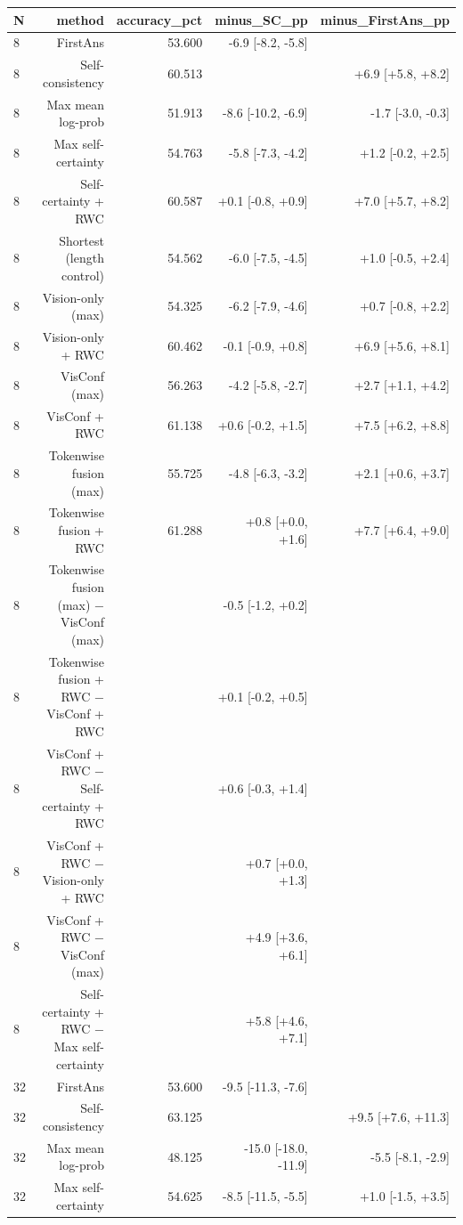 \begin{tabular}{lrrrr}
\toprule
N & method & accuracy\_pct & minus\_SC\_pp & minus\_FirstAns\_pp \\
\midrule
8 & FirstAns & 53.600 & -6.9 [-8.2, -5.8] &  \\
8 & Self-consistency & 60.513 &  & +6.9 [+5.8, +8.2] \\
8 & Max mean log-prob & 51.913 & -8.6 [-10.2, -6.9] & -1.7 [-3.0, -0.3] \\
8 & Max self-certainty & 54.763 & -5.8 [-7.3, -4.2] & +1.2 [-0.2, +2.5] \\
8 & Self-certainty + RWC & 60.587 & +0.1 [-0.8, +0.9] & +7.0 [+5.7, +8.2] \\
8 & Shortest (length control) & 54.562 & -6.0 [-7.5, -4.5] & +1.0 [-0.5, +2.4] \\
8 & Vision-only (max) & 54.325 & -6.2 [-7.9, -4.6] & +0.7 [-0.8, +2.2] \\
8 & Vision-only + RWC & 60.462 & -0.1 [-0.9, +0.8] & +6.9 [+5.6, +8.1] \\
8 & VisConf (max) & 56.263 & -4.2 [-5.8, -2.7] & +2.7 [+1.1, +4.2] \\
8 & VisConf + RWC & 61.138 & +0.6 [-0.2, +1.5] & +7.5 [+6.2, +8.8] \\
8 & Tokenwise fusion (max) & 55.725 & -4.8 [-6.3, -3.2] & +2.1 [+0.6, +3.7] \\
8 & Tokenwise fusion + RWC & 61.288 & +0.8 [+0.0, +1.6] & +7.7 [+6.4, +9.0] \\
8 & Tokenwise fusion (max) − VisConf (max) &  & -0.5 [-1.2, +0.2] &  \\
8 & Tokenwise fusion + RWC − VisConf + RWC &  & +0.1 [-0.2, +0.5] &  \\
8 & VisConf + RWC − Self-certainty + RWC &  & +0.6 [-0.3, +1.4] &  \\
8 & VisConf + RWC − Vision-only + RWC &  & +0.7 [+0.0, +1.3] &  \\
8 & VisConf + RWC − VisConf (max) &  & +4.9 [+3.6, +6.1] &  \\
8 & Self-certainty + RWC − Max self-certainty &  & +5.8 [+4.6, +7.1] &  \\
32 & FirstAns & 53.600 & -9.5 [-11.3, -7.6] &  \\
32 & Self-consistency & 63.125 &  & +9.5 [+7.6, +11.3] \\
32 & Max mean log-prob & 48.125 & -15.0 [-18.0, -11.9] & -5.5 [-8.1, -2.9] \\
32 & Max self-certainty & 54.625 & -8.5 [-11.5, -5.5] & +1.0 [-1.5, +3.5] \\

\end{tabular}
